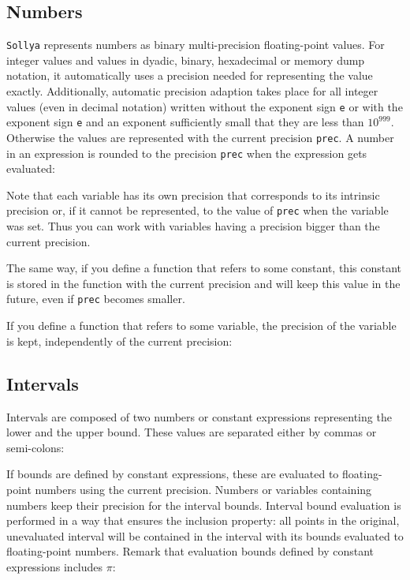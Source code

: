 \documentclass[a4paper]{article}
\newcommand{\com}[1]{\texttt{#1}}
\newcommand{\sollya}{\texttt{Sollya}\xspace}
\begin{document}


\subsection{Numbers}
\sollya represents numbers as binary multi-precision floating-point values. For integer values and values in dyadic, binary, hexadecimal or memory dump notation, it 
automatically uses a precision needed for representing the value exactly. Additionally, automatic precision adaption takes place for all 
integer values (even in decimal notation) written without the exponent sign \texttt{e} or with the exponent sign \texttt{e} and an exponent sufficiently 
small that they are less than $10^{999}$. Otherwise the values are represented with the current precision \com{prec}. A number in an expression is rounded to the precision \com{prec} when the expression gets evaluated:



Note that each variable has its own precision that corresponds to its intrinsic precision or, if it cannot be represented, to the value of \com{prec} when the variable was set. Thus you can work with variables having a precision bigger than the current precision.

The same way, if you define a function that refers to some constant, this constant is stored in the function with the current precision and will keep this value in the future, even if \com{prec} becomes smaller.

If you define a function that refers to some variable, the precision of the variable is kept, independently of the current precision:



\subsection{Intervals}
Intervals are composed of two numbers or constant expressions representing the lower and the upper bound. These values are separated either by commas or semi-colons:



If bounds are defined by constant expressions, these are evaluated to floating-point numbers using the current precision. Numbers or variables containing numbers keep their precision for the interval bounds. Interval bound evaluation is performed in a way that ensures the inclusion property: all points
in the original, unevaluated interval will be contained in the interval with its bounds evaluated to floating-point numbers. Remark that 
evaluation bounds defined by constant expressions includes $\pi$:
\end{document}

